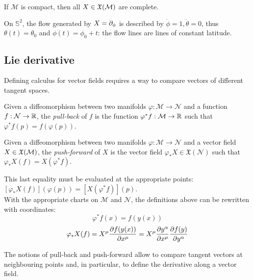 \begin{theorem}
  If $ \mathcal{M} $ is compact, then all $ X \in \mathfrak{X}(\mathcal{M}) $ are complete.
\end{theorem}

\begin{example}
  On $ \mathbb{S}^2 $, the flow generated by $ X = \partial_{\phi} $ is described by $ \dot{\phi} = 1, \dot{\theta} = 0 $, thus $ \theta(t) = \theta_0 $ and $ \phi(t) = \phi_0 + t $: the flow lines are lines of constant latitude.
\end{example}

\subsection{Lie derivative}

Defining calculus for vector fields requires a way to compare vectors of different tangent spaces.

\begin{definition}
  Given a diffeomorphism between two manifolds $ \varphi : \mathcal{M} \rightarrow \mathcal{N} $ and a function $ f : \mathcal{N} \rightarrow \mathbb{R} $, the \textit{pull-back} of $ f $ is the function $ \varphi^*f : \mathcal{M} \rightarrow \mathbb{R} $ such that $ \varphi^*f(p) = f(\varphi(p)) $.
\end{definition}

\begin{definition}
  Given a diffeomorphism between two manifolds $ \varphi : \mathcal{M} \rightarrow \mathcal{N} $ and a vector field $ X \in \mathfrak{X}(\mathcal{M}) $, the \textit{push-forward} of $ X $ is the vector field $ \varphi_*X \in \mathfrak{X}(\mathcal{N}) $ such that $ \varphi_*X(f) = X(\varphi^*f) $.
\end{definition}

This last equality must be evaluated at the appropriate points: $ [ \varphi_*X(f) ](\varphi(p)) = [ X(\varphi^*f) ](p) $.\\
With the appropriate charts on $ \mathcal{M} $ and $ \mathcal{N} $, the definitions above can be rewritten with coordinates:
\begin{equation}
  \varphi^*f(x) = f(y(x))
  \label{eq:2.12}
\end{equation}
\begin{equation}
  \varphi_*X(f) = X^{\mu} \frac{\partial f(y(x))}{\partial x^{\mu}} = X^{\mu} \frac{\partial y^{\alpha}}{\partial x^{\mu}} \frac{\partial f(y)}{\partial y^{\alpha}}
  \label{eq:2.13}
\end{equation}

The notions of pull-back and push-forward allow to compare tangent vectors at neighbouring points and, in particular, to define the derivative along a vector field.

